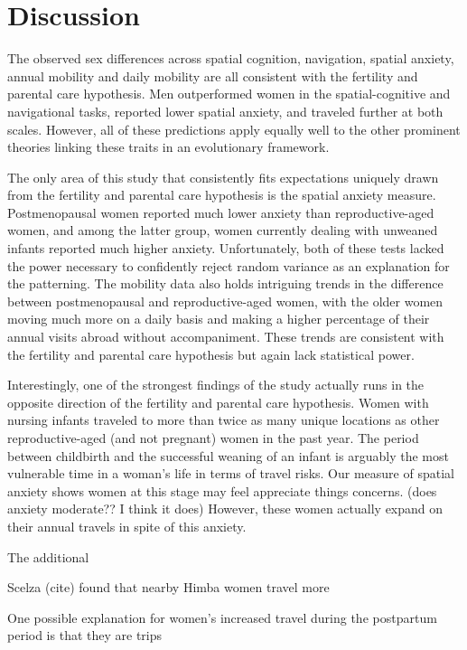\section{Discussion}
\label{sec:4}

The observed sex differences across spatial cognition, navigation, spatial anxiety, annual mobility and daily mobility are all consistent with the fertility and parental care hypothesis.  Men outperformed women in the spatial-cognitive and navigational tasks, reported lower spatial anxiety, and traveled further at both scales.  However, all of these predictions apply equally well to the other prominent theories linking these traits in an evolutionary framework.  

The only area of this study that consistently fits expectations uniquely drawn from the fertility and parental care hypothesis is the spatial anxiety measure.  Postmenopausal women reported much lower anxiety than reproductive-aged women, and among the latter group, women currently dealing with unweaned infants reported much higher anxiety.  Unfortunately, both of these tests lacked the power necessary to confidently reject random variance as an explanation for the patterning.  The mobility data also holds intriguing trends in the difference between postmenopausal and reproductive-aged women, with the older women moving much more on a daily basis and making a higher percentage of their annual visits abroad without accompaniment.  These trends are consistent with the fertility and parental care hypothesis but again lack statistical power.

Interestingly, one of the strongest findings of the study actually runs in the opposite direction of the fertility and parental care hypothesis.  Women with nursing infants traveled to more than twice as many unique locations as other reproductive-aged (and not pregnant) women in the past year.  The period between childbirth and the successful weaning of an infant is arguably the most vulnerable time in a woman's life in terms of travel risks.  Our measure of spatial anxiety shows women at this stage may feel appreciate things concerns. (does anxiety moderate??  I think it does)  However, these women actually expand on their annual travels in spite of this anxiety.  

The additional 

Scelza (cite) found that nearby Himba women travel more  

One possible explanation for women's increased travel during the postpartum period is that they are trips   

